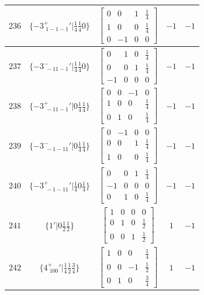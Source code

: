 \documentclass[fleqn,8pt]{jsarticle}
\begin{document}
\begin{longtable}{ccccc}
$ 236 $ & $ \{-3^{+}_{\,\,1-1-1}{}'|\frac{1}{4} \frac{1}{4} 0\} $ & $ \begin{bmatrix} 0 & 0 & 1 & \frac{1}{4} \\ 1 & 0 & 0 & \frac{1}{4} \\ 0 & -1 & 0 & 0 \end{bmatrix} $ & $ -1 $ & $ -1 $ \\ \hline
$ 237 $ & $ \{-3^{-}_{\,\,-11-1}{}'|\frac{1}{4} \frac{1}{4} 0\} $ & $ \begin{bmatrix} 0 & 1 & 0 & \frac{1}{4} \\ 0 & 0 & 1 & \frac{1}{4} \\ -1 & 0 & 0 & 0 \end{bmatrix} $ & $ -1 $ & $ -1 $ \\ \hline
$ 238 $ & $ \{-3^{+}_{\,\,-11-1}{}'|0 \frac{1}{4} \frac{1}{4}\} $ & $ \begin{bmatrix} 0 & 0 & -1 & 0 \\ 1 & 0 & 0 & \frac{1}{4} \\ 0 & 1 & 0 & \frac{1}{4} \end{bmatrix} $ & $ -1 $ & $ -1 $ \\ \hline
$ 239 $ & $ \{-3^{-}_{\,\,-1-11}{}'|0 \frac{1}{4} \frac{1}{4}\} $ & $ \begin{bmatrix} 0 & -1 & 0 & 0 \\ 0 & 0 & 1 & \frac{1}{4} \\ 1 & 0 & 0 & \frac{1}{4} \end{bmatrix} $ & $ -1 $ & $ -1 $ \\ \hline
$ 240 $ & $ \{-3^{+}_{\,\,-1-11}{}'|\frac{1}{4} 0 \frac{1}{4}\} $ & $ \begin{bmatrix} 0 & 0 & 1 & \frac{1}{4} \\ -1 & 0 & 0 & 0 \\ 0 & 1 & 0 & \frac{1}{4} \end{bmatrix} $ & $ -1 $ & $ -1 $ \\ \hline
$ 241 $ & $ \{1{}'|0 \frac{1}{2} \frac{1}{2}\} $ & $ \begin{bmatrix} 1 & 0 & 0 & 0 \\ 0 & 1 & 0 & \frac{1}{2} \\ 0 & 0 & 1 & \frac{1}{2} \end{bmatrix} $ & $ 1 $ & $ -1 $ \\ \hline
$ 242 $ & $ \{4^{+}_{\,\,100}{}'|\frac{1}{4} \frac{1}{2} \frac{3}{4}\} $ & $ \begin{bmatrix} 1 & 0 & 0 & \frac{1}{4} \\ 0 & 0 & -1 & \frac{1}{2} \\ 0 & 1 & 0 & \frac{3}{4} \end{bmatrix} $ & $ 1 $ & $ -1 $ \\ \hline

\end{longtable}
\end{document}
